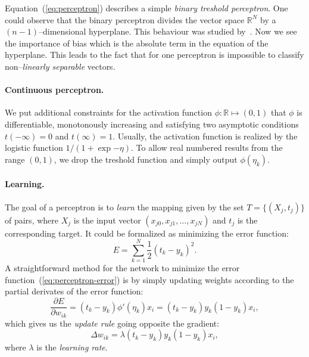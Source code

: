 Equation~(\ref{eq:perceptron}) describes a simple \emph{binary treshold perceptron}. One could observe that the binary perceptron divides the vector space $\mathbb{R}^N$ by a $(n-1)$--dimensional hyperplane. This behaviour was studied by~\citet{rosenblatt1958perceptron}. Now we see the importance of bias which is the absolute term in the equation of the hyperplane. \label{sec:linear-sep} This leads to the fact that for one perceptron is impossible to classify non--\emph{linearly separable} vectors. 

\paragraph{Continuous perceptron.}
We put additional constraints for the activation function $\phi : \mathbb{R} \mapsto (0,1)$ that $\phi$ is differentiable, monotonously increasing and satisfying two asymptotic conditions $t(-\infty)=0$ and $t(\infty)=1$.  Usually, the activation function is realized by the logistic function $1 / (1 + \exp{-\eta})$. To allow real numbered results from the range $(0,1)$, we drop the treshold function and simply output $\phi(\eta_k)$. 

\paragraph{Learning.} 
The goal of a perceptron is to \emph{learn} the mapping given by the set $T = \{(X_j, t_j)\}$ of pairs, where $X_j$ is the input vector $(x_{j0},x_{j1}, \ldots, x_{jN})$ and $t_j$ is the corresponding target. It could be formalized as minimizing the error function: 
\begin{equation}
\label{eq:perceptron-error} 
E = \sum_{k=1}^{N} \frac{1}{2}(t_k-y_k)^2.
\end{equation} 
A straightforward method for the network to minimize the error function~(\ref{eq:perceptron-error}) is by simply updating weights according to the partial derivates of the error function: 
\begin{equation}
\label{eq:perceptron-learning} 
\frac{\partial E}{\partial w_{ik}} = (t_k - y_k)\phi'(\eta_k)x_i = (t_k - y_k)y_k(1 - y_k)x_i,
\end{equation} 
which gives us the \emph{update rule} going opposite the gradient: 
\begin{equation} 
\label{eq:perceptron-learning-rule} 
\Delta w_{ik} = \lambda (t_k - y_k)y_k(1 - y_k)x_i,
\end{equation} 
where $\lambda$ is the \emph{learning rate}. 

